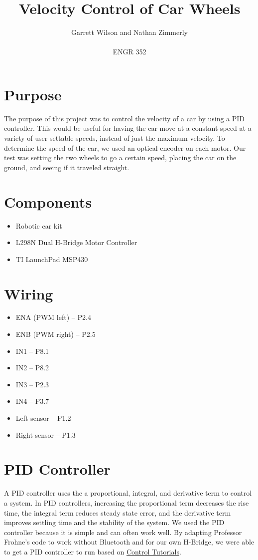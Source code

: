 \documentclass{article}
\begin{document}
\title{Velocity Control of Car Wheels}
\author{Garrett Wilson and Nathan Zimmerly \\ \\
ENGR 352}
\maketitle

\clearpage

\tableofcontents

\pagebreak

\section{Purpose}
The purpose of this project was to control the velocity of a car by using a PID controller. This would be useful for having the car move at a constant speed at a variety of user-settable speeds, instead of just the maximum velocity. To determine the speed of the car, we used an optical encoder on each motor. Our test was setting the two wheels to go a certain speed, placing the car on the ground, and seeing if it traveled straight.

\section{Components}
\begin{itemize}
\item Robotic car kit
\item L298N Dual H-Bridge Motor Controller
\item TI LaunchPad MSP430
\end{itemize}

\section{Wiring}
\begin{itemize}
\item ENA (PWM left) -- P2.4
\item ENB (PWM right) -- P2.5
\item IN1 -- P8.1
\item IN2 -- P8.2
\item IN3 -- P2.3
\item IN4 -- P3.7
\item Left sensor -- P1.2
\item Right sensor -- P1.3
\end{itemize}

\section{PID Controller}
A PID controller uses the a proportional, integral, and derivative term to control a system. In PID controllers, increasing the proportional term decreases the rise time, the integral term reduces steady state error, and the derivative term improves settling time and the stability of the system. We used the PID controller because it is simple and can often work well. By adapting Professor Frohne's code to work without Bluetooth and for our own H-Bridge, we were able to get a PID controller to run based on \href{http://ctms.engin.umich.edu/CTMS/index.php}{Control Tutorials}.
\end{document}
